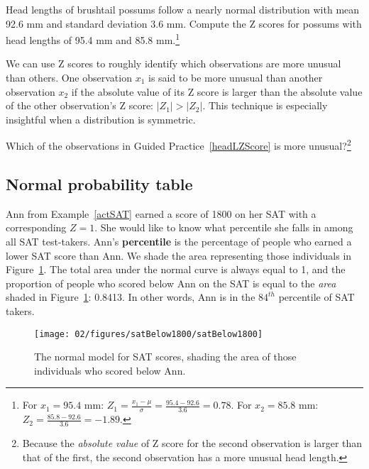 \begin{exercise} \label{headLZScore}
Head lengths of brushtail possums follow a nearly normal distribution with mean 92.6 mm and standard deviation 3.6 mm. Compute the Z scores for possums with head lengths of 95.4 mm and 85.8 mm.\footnote{For $x_1=95.4$ mm: $Z_1 = \frac{x_1 - \mu}{\sigma} = \frac{95.4 - 92.6}{3.6} = 0.78$. For $x_2=85.8$ mm: $Z_2 = \frac{85.8 - 92.6}{3.6} = -1.89$.}
\end{exercise}

We can use Z scores to roughly identify which observations are more unusual than others. One observation $x_1$ is said to be more unusual than another observation $x_2$ if the absolute value of its Z score is larger than the absolute value of the other observation's Z score: $|Z_1| > |Z_2|$. This technique is especially insightful when a distribution is symmetric.

\begin{exercise}
Which of the observations in Guided Practice~\ref{headLZScore} is more \mbox{unusual}?\footnote{Because the \emph{absolute value} of Z score for the second observation is larger than that of the first, the second observation has a more unusual head length.}
\end{exercise}


\subsection{Normal probability table}

\begin{example}{Ann from Example~\ref{actSAT} earned a score of 1800 on her SAT with a corresponding $Z=1$. She would like to know what percentile she falls in among all SAT test-takers.}
Ann's \textbf{percentile} is the percentage of people who earned a lower SAT score than Ann. We shade the area representing those individuals in Figure~\ref{satBelow1800}. The total area under the normal curve is always equal to 1, and the proportion of people who scored below Ann on the SAT is equal to the \emph{area} shaded in Figure~\ref{satBelow1800}: 0.8413. In other words, Ann is in the $84^{th}$ percentile of SAT takers.
\end{example}

\begin{figure}[htb]
   \centering
   \texttt{[image: 02/figures/satBelow1800/satBelow1800]}
   \caption{The normal model for SAT scores, shading the area of those individuals who scored below Ann.}
   \label{satBelow1800}
\end{figure}

